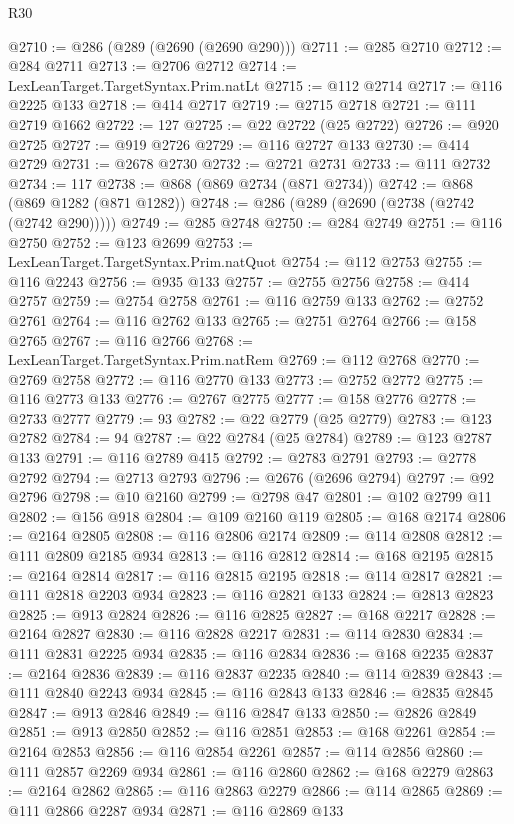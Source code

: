 \begin{lexlean}{R30}
\begin{coremodule}
@2710 := @286 (@289 (@2690 (@2690 @290)))
@2711 := @285 @2710
@2712 := @284 @2711
@2713 := @2706 @2712
@2714 := LexLeanTarget.TargetSyntax.Prim.natLt
@2715 := @112 @2714
@2717 := @116 @2225 @133
@2718 := @414 @2717
@2719 := @2715 @2718
@2721 := @111 @2719 @1662
@2722 := 127
@2725 := @22 @2722 (@25 @2722)
@2726 := @920 @2725
@2727 := @919 @2726
@2729 := @116 @2727 @133
@2730 := @414 @2729
@2731 := @2678 @2730
@2732 := @2721 @2731
@2733 := @111 @2732
@2734 := 117
@2738 := @868 (@869 @2734 (@871 @2734))
@2742 := @868 (@869 @1282 (@871 @1282))
@2748 := @286 (@289 (@2690 (@2738 (@2742 (@2742 @290)))))
@2749 := @285 @2748
@2750 := @284 @2749
@2751 := @116 @2750
@2752 := @123 @2699
@2753 := LexLeanTarget.TargetSyntax.Prim.natQuot
@2754 := @112 @2753
@2755 := @116 @2243
@2756 := @935 @133
@2757 := @2755 @2756
@2758 := @414 @2757
@2759 := @2754 @2758
@2761 := @116 @2759 @133
@2762 := @2752 @2761
@2764 := @116 @2762 @133
@2765 := @2751 @2764
@2766 := @158 @2765
@2767 := @116 @2766
@2768 := LexLeanTarget.TargetSyntax.Prim.natRem
@2769 := @112 @2768
@2770 := @2769 @2758
@2772 := @116 @2770 @133
@2773 := @2752 @2772
@2775 := @116 @2773 @133
@2776 := @2767 @2775
@2777 := @158 @2776
@2778 := @2733 @2777
@2779 := 93
@2782 := @22 @2779 (@25 @2779)
@2783 := @123 @2782
@2784 := 94
@2787 := @22 @2784 (@25 @2784)
@2789 := @123 @2787 @133
@2791 := @116 @2789 @415
@2792 := @2783 @2791
@2793 := @2778 @2792
@2794 := @2713 @2793
@2796 := @2676 (@2696 @2794)
@2797 := @92 @2796
@2798 := @10 @2160
@2799 := @2798 @47
@2801 := @102 @2799 @11
@2802 := @156 @918
@2804 := @109 @2160 @119
@2805 := @168 @2174
@2806 := @2164 @2805
@2808 := @116 @2806 @2174
@2809 := @114 @2808
@2812 := @111 @2809 @2185 @934
@2813 := @116 @2812
@2814 := @168 @2195
@2815 := @2164 @2814
@2817 := @116 @2815 @2195
@2818 := @114 @2817
@2821 := @111 @2818 @2203 @934
@2823 := @116 @2821 @133
@2824 := @2813 @2823
@2825 := @913 @2824
@2826 := @116 @2825
@2827 := @168 @2217
@2828 := @2164 @2827
@2830 := @116 @2828 @2217
@2831 := @114 @2830
@2834 := @111 @2831 @2225 @934
@2835 := @116 @2834
@2836 := @168 @2235
@2837 := @2164 @2836
@2839 := @116 @2837 @2235
@2840 := @114 @2839
@2843 := @111 @2840 @2243 @934
@2845 := @116 @2843 @133
@2846 := @2835 @2845
@2847 := @913 @2846
@2849 := @116 @2847 @133
@2850 := @2826 @2849
@2851 := @913 @2850
@2852 := @116 @2851
@2853 := @168 @2261
@2854 := @2164 @2853
@2856 := @116 @2854 @2261
@2857 := @114 @2856
@2860 := @111 @2857 @2269 @934
@2861 := @116 @2860
@2862 := @168 @2279
@2863 := @2164 @2862
@2865 := @116 @2863 @2279
@2866 := @114 @2865
@2869 := @111 @2866 @2287 @934
@2871 := @116 @2869 @133

\end{coremodule}
\end{lexlean}
